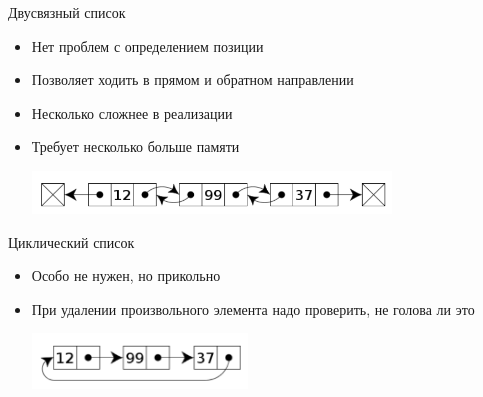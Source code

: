 \documentclass{../../slides-style}
\begin{document}
    \begin{frame}{Двусвязный список}
        \begin{itemize}
            \item Нет проблем с определением позиции
            \item Позволяет ходить в прямом и обратном направлении
            \item Несколько сложнее в реализации
            \item Требует несколько больше памяти
            \begin{center}
                \includegraphics[width=0.75\textwidth]{double-linked-list.png}
            \end{center}
        \end{itemize}
    \end{frame}

    \begin{frame}{Циклический список}
        \begin{itemize}
            \item Особо не нужен, но прикольно
            \item При удалении произвольного элемента надо проверить, не голова ли это
            \begin{center}
                \includegraphics[width=0.45\textwidth]{cyclic-list.png}
            \end{center}
        \end{itemize}
    \end{frame}
\end{document}
